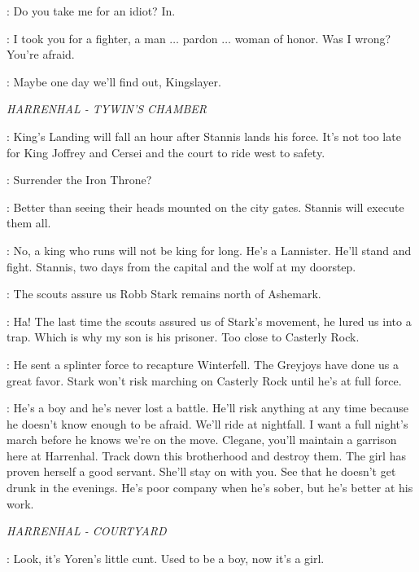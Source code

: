 \BRIENNE: Do you take me for an idiot? In. 

\JAIME: I took you for a fighter, a man $\ldots$ pardon $\ldots$ woman of honor. Was I wrong? You're afraid. 

\BRIENNE: Maybe one day we'll find out, Kingslayer. 


\scene

\textit{HARRENHAL - TYWIN'S CHAMBER} 


\KEVAN: King's Landing will fall an hour after Stannis lands his force. It's not too late for King Joffrey and Cersei and the court to ride west to safety. 

\TYWIN: Surrender the Iron Throne? 

\KEVAN: Better than seeing their heads mounted on the city gates. Stannis will execute them all. 

\TYWIN: No, a king who runs will not be king for long. He's a Lannister. He'll stand and fight. Stannis, two days from the capital and the wolf at my doorstep. 

\KEVAN: The scouts assure us Robb Stark remains north of Ashemark. 

\TYWIN: Ha! The last time the scouts assured us of Stark's movement, he lured us into a trap. Which is why my son is his prisoner. Too close to Casterly Rock. 

\KEVAN: He sent a splinter force to recapture Winterfell. The Greyjoys have done us a great favor. Stark won't risk marching on Casterly Rock until he's at full force. 

\TYWIN: He's a boy and he's never lost a battle. He'll risk anything at any time because he doesn't know enough to be afraid. We'll ride at nightfall. I want a full night's march before he knows we're on the move. Clegane, you'll maintain a garrison here at Harrenhal. Track down this brotherhood and destroy them. The girl has proven herself a good servant. She'll stay on with you. See that he doesn't get drunk in the evenings. He's poor company when he's sober, but he's better at his work. 


\scene

\textit{HARRENHAL - COURTYARD} 



\BITER: Look, it's Yoren's little cunt. Used to be a boy, now it's a girl. 

